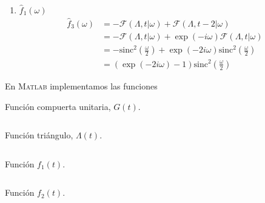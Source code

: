 \documentclass[a4paper,12pt,final]{article}
\begin{document}
\begin{enumerate}[label=\alph*)]
        \item $\widehat{f}_{1}\left(\omega\right)$
          \begin{equation*}
            \begin{split}
              \widehat{f}_{3}\left(\omega\right) & = - \mathcal{F}\left(\Lambda,t|\omega\right) + \mathcal{F}\left(\Lambda,t-2|\omega\right) \\
                                                 & = - \mathcal{F}\left(\Lambda,t|\omega\right) + \exp\left(- i \omega\right) \mathcal{F}\left(\Lambda,t|\omega\right) \\
                                                 & = - \mathrm{sinc}^{2}\left(\frac{\omega}{2}\right) + \exp\left(- 2 i \omega\right) \mathrm{sinc}^{2}\left(\frac{\omega}{2}\right) \\
                                                 & = \left(\exp\left(- 2 i \omega\right) - 1\right)\mathrm{sinc}^{2}\left(\frac{\omega}{2}\right)
            \end{split}
          \end{equation*}
      \end{enumerate}

      \noindent En \textsc{Matlab} implementamos las funciones

      \begin{listing}[H]
        \caption{Función compuerta unitaria, $G\left(t\right)$.}
        \label{script01A}
        \inputminted{matlab}{./laboratorio_4/gate.m}
      \end{listing}\vspace{-1.0em}

      \begin{listing}[H]
        \caption{Función triángulo, $\Lambda\left(t\right)$.}
        \label{script01B}
        \inputminted{matlab}{./laboratorio_4/triangle.m}
      \end{listing}\vspace{-1.0em}

      \begin{listing}[H]
        \caption{Función $f_1\left(t\right)$.}
        \label{script01C}
        \inputminted{matlab}{./laboratorio_4/p1_f1.m}
      \end{listing}\vspace{-1.0em}

      \begin{listing}[H]
        \caption{Función $f_2\left(t\right)$.}
        \label{script01D}
        \inputminted{matlab}{./laboratorio_4/p1_f2.m}
      \end{listing}\vspace{-1.0em}
\end{document}
